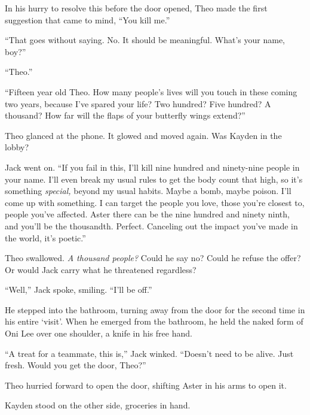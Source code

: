 In his hurry to resolve this before the door opened, Theo made the first suggestion that came to mind, ``You kill me.''



``That goes without saying.  No.  It should be meaningful.  What's your name, boy?''



``Theo.''



``Fifteen year old Theo.  How many people's lives will you touch in these coming two years, because I've spared your life?  Two hundred?  Five hundred?  A thousand?  How far will the flaps of your butterfly wings extend?''



Theo glanced at the phone.  It glowed and moved again.  Was Kayden in the lobby?



Jack went on.  ``If you fail in this, I'll kill nine hundred and ninety-nine people in your name.  I'll even break my usual rules to get the body count that high, so it's something \emph{special, }beyond my usual habits.  Maybe a bomb, maybe poison.  I'll come up with something.  I can target the people you love, those you're closest to, people you've affected.  Aster there can be the nine hundred and ninety ninth, and you'll be the thousandth.  Perfect.  Canceling out the impact you've made in the world, it's poetic.''



Theo swallowed.  \emph{A thousand people?  }Could he say no?  Could he refuse the offer?  Or would Jack carry what he threatened regardless?



``Well,'' Jack spoke, smiling.  ``I'll be off.''



He stepped into the bathroom, turning away from the door for the second time in his entire `visit'.  When he emerged from the bathroom, he held the naked form of Oni Lee over one shoulder, a knife in his free hand.



``A treat for a teammate, this is,'' Jack winked.  ``Doesn't need to be alive.  Just fresh.  Would you get the door, Theo?''



Theo hurried forward to open the door, shifting Aster in his arms to open it.



Kayden stood on the other side, groceries in hand.



